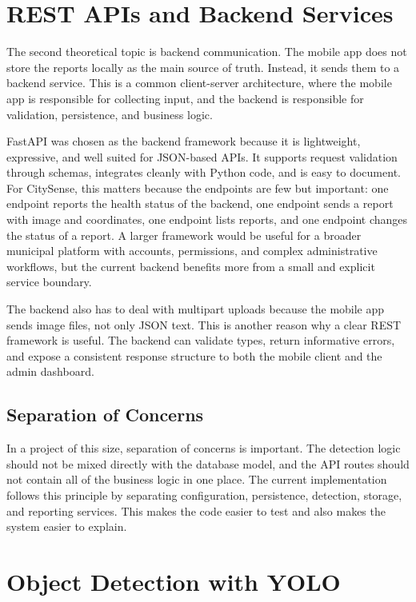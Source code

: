 \section{REST APIs and Backend Services}

The second theoretical topic is backend communication. The mobile app does not store the reports locally as the main source of truth. Instead, it sends them to a backend service. This is a common client-server architecture, where the mobile app is responsible for collecting input, and the backend is responsible for validation, persistence, and business logic.

FastAPI \cite{fastapi_docs} was chosen as the backend framework because it is lightweight, expressive, and well suited for JSON-based APIs. It supports request validation through schemas, integrates cleanly with Python code, and is easy to document. For CitySense, this matters because the endpoints are few but important: one endpoint reports the health status of the backend, one endpoint sends a report with image and coordinates, one endpoint lists reports, and one endpoint changes the status of a report. A larger framework would be useful for a broader municipal platform with accounts, permissions, and complex administrative workflows, but the current backend benefits more from a small and explicit service boundary.

The backend also has to deal with multipart uploads because the mobile app sends image files, not only JSON text. This is another reason why a clear REST framework is useful. The backend can validate types, return informative errors, and expose a consistent response structure to both the mobile client and the admin dashboard.

\subsection{Separation of Concerns}

In a project of this size, separation of concerns is important. The detection logic should not be mixed directly with the database model, and the API routes should not contain all of the business logic in one place. The current implementation follows this principle by separating configuration, persistence, detection, storage, and reporting services. This makes the code easier to test and also makes the system easier to explain.

\section{Object Detection with YOLO}

